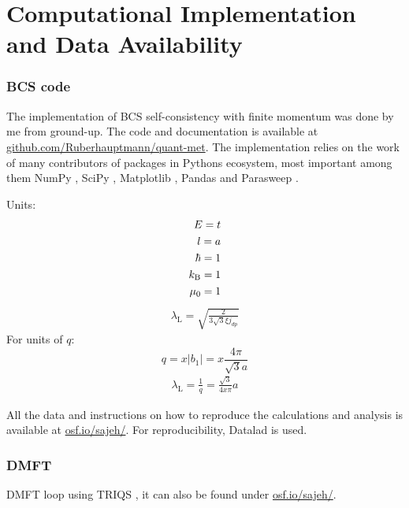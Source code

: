 \documentclass[../notes.tex]{subfiles}
\begin{document}
\raggedbottom
	
\chapter{Computational Implementation and Data Availability}

\subsection*{BCS code}

The implementation of BCS self-consistency with finite momentum was done by me from ground-up.
The code and documentation is available at \href{https://github.com/Ruberhauptmann/quant-met}{github.com/Ruberhauptmann/quant-met}.
The implementation relies on the work of many contributors of packages in Pythons ecosystem, most important among them NumPy \cite{harrisArrayProgrammingNumPy2020}, SciPy \cite{virtanenSciPy10Fundamental2020}, Matplotlib \cite{hunterMatplotlib2DGraphics2007}, Pandas \cite{mckinneyDataStructuresStatistical2010, thepandasdevelopmentteamPandasdevPandasPandas2024} and Parasweep \cite{bachParasweepTemplatebasedUtility2021}.

Units:
\begin{align}
	E = t \\
	l = a \\
	\hbar = 1 \\
	k_{\mathrm{B}} = 1 \\
	\mu_0 = 1
\end{align}
\begin{align}
	\lambda_{\mathrm{L}} = \sqrt{\frac{2}{3 \sqrt{3} \xi j_{dp}}}
\end{align}
For units of \(q\):
\begin{equation}
	q = x \vert b_1 \vert = x \frac{4 \pi}{\sqrt{3} a}
\end{equation}
\begin{align}
	\lambda_{\mathrm{L}} = \frac{1}{q} = \frac{\sqrt{3}}{4 x \pi} a
\end{align}

All the data and instructions on how to reproduce the calculations and analysis is available at \href{https://osf.io/sajeh/}{osf.io/sajeh/}.
For reproducibility, Datalad \cite{halchenkoDataLadDistributedSystem2021} is used.

\subsection*{DMFT}

DMFT loop using TRIQS \cite{parcolletTRIQSToolboxResearch2015}, it can also be found under \href{https://osf.io/sajeh/}{osf.io/sajeh/}.
\end{document}
